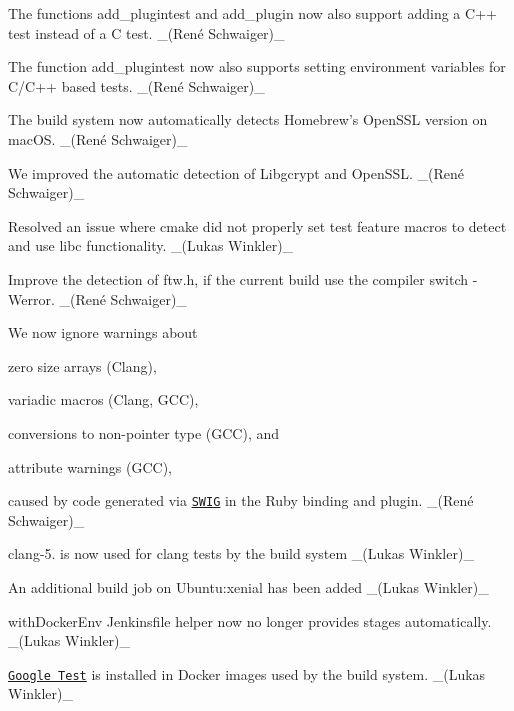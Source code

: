 \begin{DoxyItemize}
\item The functions {\ttfamily add\+\_\+plugintest} and {\ttfamily add\+\_\+plugin} now also support adding a C++ test instead of a C test. \+\_\+(René Schwaiger)\+\_\+
\item The function {\ttfamily add\+\_\+plugintest} now also supports setting environment variables for C/\+C++ based tests. \+\_\+(René Schwaiger)\+\_\+
\item The build system now automatically detects Homebrew’s Open\+S\+SL version on mac\+OS. \+\_\+(René Schwaiger)\+\_\+
\item We improved the automatic detection of Libgcrypt and Open\+S\+SL. \+\_\+(René Schwaiger)\+\_\+
\item Resolved an issue where cmake did not properly set test feature macros to detect and use libc functionality. \+\_\+(\+Lukas Winkler)\+\_\+
\item Improve the detection of {\ttfamily ftw.\+h}, if the current build use the compiler switch {\ttfamily -\/\+Werror}. \+\_\+(René Schwaiger)\+\_\+
\item We now ignore warnings about
\begin{DoxyItemize}
\item zero size arrays (Clang),
\item variadic macros (Clang, G\+CC),
\item conversions to non-\/pointer type (G\+CC), and
\item attribute warnings (G\+CC),
\end{DoxyItemize}

caused by code generated via \href{http://www.swig.org}{\tt S\+W\+IG} in the Ruby binding and plugin. \+\_\+(René Schwaiger)\+\_\+
\end{DoxyItemize}


\begin{DoxyItemize}
\item {\ttfamily clang-\/5.} is now used for clang tests by the build system \+\_\+(\+Lukas Winkler)\+\_\+
\item An additional build job on Ubuntu\+:xenial has been added \+\_\+(\+Lukas Winkler)\+\_\+
\item {\ttfamily with\+Docker\+Env} Jenkinsfile helper now no longer provides stages automatically. \+\_\+(\+Lukas Winkler)\+\_\+
\item \href{https://github.com/google/googletest}{\tt Google Test} is installed in Docker images used by the build system. \+\_\+(\+Lukas Winkler)\+\_\+
\end{DoxyItemize}


